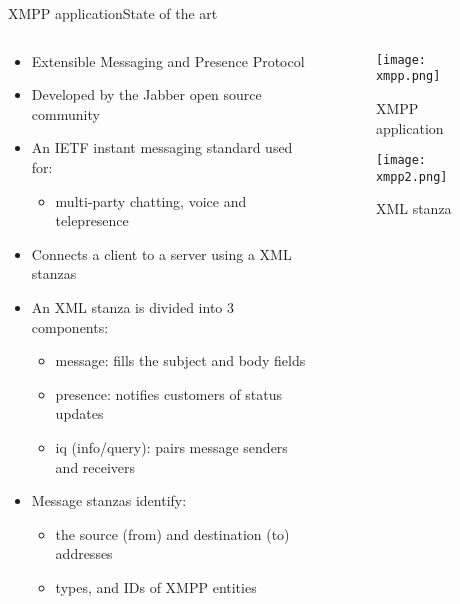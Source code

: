 \begin{frame}{XMPP application}{State of the art}
	\begin{columns}
		
		\begin{column}{0.6\textwidth}
		
			\begin{itemize}
				\item Extensible Messaging and Presence Protocol
				\item Developed by the Jabber open source community
				\item An IETF instant messaging standard used for:
					\begin{itemize}
						\item multi-party chatting, voice and telepresence
					\end{itemize}
				\item Connects a client to a server using a XML stanzas
				\item An XML stanza is divided into 3 components:
					\begin{itemize}
						\item message: fills the subject and body fields
						\item presence: notifies customers of status updates
						\item iq (info/query): pairs message senders and receivers
					\end{itemize}
				\item Message stanzas identify:
					\begin{itemize}
						\item the source (from) and destination (to) addresses
						\item types, and IDs of XMPP entities
					\end{itemize}
			\end{itemize}
			
		\end{column}
	
			\begin{column}{0.4\textwidth}
			\begin{center}
			
				\begin{figure}
					\texttt{[image: xmpp.png]}
					\caption{\label{fig:xmpp} XMPP application}
				\end{figure}
				
				\begin{figure}
					\texttt{[image: xmpp2.png]}
					\caption{\label{fig:xmpp2} XML stanza}
				\end{figure}
				
			\end{center}
		\end{column}
		
	\end{columns}
	
\end{frame}

